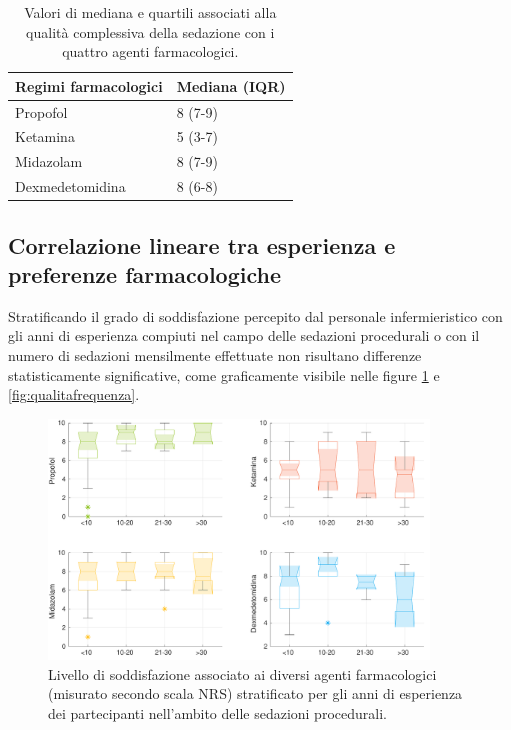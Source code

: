 \bgroup
\def\arraystretch{1.5}
\begin{table}[h]
    \centering
    \begin{tabular}{|l|l|}
         Regimi farmacologici & Mediana (IQR) \\ \hline
       Propofol & 8 (7-9)  \\
       Ketamina & 5 (3-7) \\
       Midazolam & 8 (7-9) \\
       Dexmedetomidina & 8 (6-8) 
    \end{tabular}
    \caption{Valori di mediana e quartili associati alla qualità complessiva della sedazione con i quattro agenti farmacologici.}
    \label{tab:qualitased}
\end{table}
\egroup

\subsection*{Correlazione lineare tra esperienza e preferenze farmacologiche}

Stratificando il grado di soddisfazione percepito dal personale infermieristico con gli anni di esperienza compiuti nel campo delle sedazioni procedurali o con il numero di sedazioni mensilmente effettuate non risultano differenze statisticamente significative, come graficamente visibile nelle figure \ref{fig:qualitaesperienza} e \ref {fig:qualitafrequenza}.

\begin{figure}[h]
    \centering
    \includegraphics[width=0.9\textwidth]{Figure/qualita-strat-esperienza.pdf}
    \caption{Livello di soddisfazione associato ai diversi agenti farmacologici (misurato secondo scala NRS) stratificato per gli anni di esperienza dei partecipanti nell'ambito delle sedazioni procedurali.}
    \label{fig:qualitaesperienza}
\end{figure}

